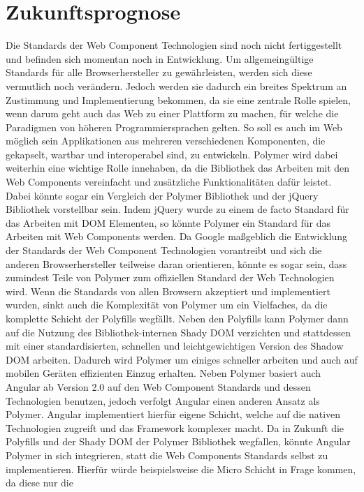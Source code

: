 \chapter{Zukunftsprognose}\label{zukunftsprognose}

Die Standards der Web Component Technologien sind noch nicht
fertiggestellt und befinden sich momentan noch in Entwicklung. Um
allgemeingültige Standards für alle Browserhersteller zu gewährleisten,
werden sich diese vermutlich noch verändern. Jedoch werden sie dadurch
ein breites Spektrum an Zustimmung und Implementierung bekommen, da sie
eine zentrale Rolle spielen, wenn darum geht auch das Web zu einer
Plattform zu machen, für welche die Paradigmen von höheren
Programmiersprachen gelten. So soll es auch im Web möglich sein
Applikationen aus mehreren verschiedenen Komponenten, die gekapselt,
wartbar und interoperabel sind, zu entwickeln. Polymer wird dabei
weiterhin eine wichtige Rolle innehaben, da die Bibliothek das Arbeiten
mit den Web Components vereinfacht und zusätzliche Funktionalitäten
dafür leistet. Dabei könnte sogar ein Vergleich der Polymer Bibliothek
und der jQuery Bibliothek vorstellbar sein. Indem jQuery wurde zu einem
de facto Standard für das Arbeiten mit DOM Elementen, so könnte Polymer
ein Standard für das Arbeiten mit Web Components werden. Da Google
maßgeblich die Entwicklung der Standards der Web Component Technologien
vorantreibt und sich die anderen Browserhersteller teilweise daran
orientieren, könnte es sogar sein, dass zumindest Teile von Polymer zum
offiziellen Standard der Web Technologien wird. Wenn die Standards von
allen Browsern akzeptiert und implementiert wurden, sinkt auch die
Komplexität von Polymer um ein Vielfaches, da die komplette Schicht der
Polyfills wegfällt. Neben den Polyfills kann Polymer dann auf die
Nutzung des Bibliothek-internen Shady DOM verzichten und stattdessen mit
einer standardisierten, schnellen und leichtgewichtigen Version des
Shadow DOM arbeiten. Dadurch wird Polymer um einiges schneller arbeiten
und auch auf mobilen Geräten effizienten Einzug erhalten. Neben Polymer
basiert auch Angular ab Version 2.0 auf den Web Component Standards und
dessen Technologien benutzen, jedoch verfolgt Angular einen anderen
Ansatz als Polymer. Angular implementiert hierfür eigene Schicht, welche
auf die nativen Technologien zugreift und das Framework komplexer macht.
Da in Zukunft die Polyfills und der Shady DOM der Polymer Bibliothek
wegfallen, könnte Angular Polymer in sich integrieren, statt die Web
Components Standards selbst zu implementieren. Hierfür würde
beispielsweise die Micro Schicht in Frage kommen, da diese nur die
